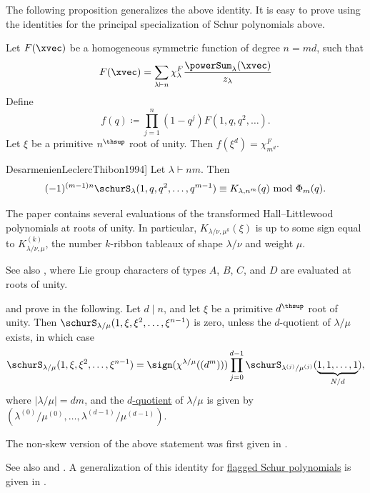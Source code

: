 The following proposition generalizes the above identity.
It is easy to prove using the identities for the principal specialization of Schur polynomials above.
\begin{proposition}
 Let $F(\xvec)$ be a homogeneous symmetric function of degree $n = md$, such that
 \[
  F(\xvec) = \sum_{\lambda \vdash n} \chi^F_\lambda \frac{\powerSum_\lambda(\xvec)}{z_\lambda}
 \]
 Define
 \[
  f(q) \coloneqq \prod_{j=1}^n (1-q^j) F(1,q,q^2,\dotsc).
 \]
Let $\xi$ be a primitive $n^\thsup$ root of unity. Then $f(\xi^d) = \chi^F_{m^d}$.
\end{proposition}




\begin{theorem}[From \cite[Thm.~9.14]{DesarmenienLeclercThibon1994}]
Let $\lambda \vdash nm$. Then
\[
(-1)^{(m-1)n} \schurS_\lambda(1,q,q^2,\dotsc,q^{m-1}) \equiv K_{\lambda,n^m}(q) \text{ mod } \Phi_m(q).
\]
\end{theorem}
The paper \cite{DesarmenienLeclercThibon1994} contains several evaluations of
the transformed Hall--Littlewood polynomials at roots of unity.
In particular, $K_{\lambda/\nu,\mu^k}(\xi)$ is up to some sign
equal to $K^{(k)}_{\lambda/\nu,\mu}$, the number $k$-ribbon tableaux of shape $\lambda/\nu$
and weight $\mu$.

See also \cite{AyyerKumari2022,Albion2023}, where Lie group characters of
types $A$, $B$, $C$, and $D$ are evaluated at roots of unity.

\begin{theorem}[Lee--Oh 2022]
 and  prove in \cite[Thm.~16]{LeeOh2022}
the following.
Let $d \mid n$, and let $\xi$ be a primitive $d^\thsup$ root of unity.
Then $\schurS_{\lambda/\mu}(1,\xi,\xi^2,\dotsc,\xi^{n-1})$ is zero, unless
the $d$-quotient of $\lambda/\mu$ exists, in which case
\[
\schurS_{\lambda/\mu}(1,\xi,\xi^2,\dotsc,\xi^{n-1}) = \sign(\chi^{\lambda/\mu}((d^m))) \prod_{j=0}^{d-1}
\schurS_{\lambda^{(j)}/\mu^{(j)}}(\underbrace{1,1,\dotsc,1}_{N/d}),
\]
where $|\lambda/\mu| = dm$, and the \hyperref[partitionQuotient]{$d$-quotient} of $\lambda/\mu$
is given by $\left( \lambda^{(0)}/\mu^{(0)}, \dotsc,  \lambda^{(d-1)}/\mu^{(d-1)} \right)$.

The non-skew version of the above statement
was first given in \cite[Thm.~16]{ReinerStantonWhite2004}.
\end{theorem}
See also \cite{Kumari2022x} and \cite[Chap.~I, §5, Ex.~24]{Macdonald1995}.
A generalization of this identity for \hyperref[schurFlagged]{flagged Schur
polynomials} is given in \cite{Kumar2023x}.


